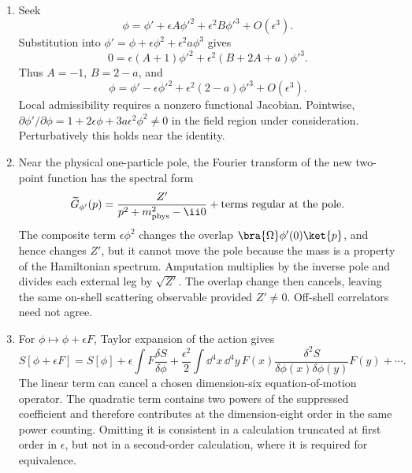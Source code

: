 \begin{enumerate}
\begin{enumerate}
\item
Seek
\[
 \phi=\phi'+\epsilon A\phi'^2+\epsilon^2B\phi'^3+O(\epsilon^3).
\]
Substitution into
\(\phi'=\phi+\epsilon\phi^2+\epsilon^2a\phi^3\) gives
\[
 0=\epsilon(A+1)\phi'^2
 +\epsilon^2(B+2A+a)\phi'^3.
\]
Thus \(A=-1\), \(B=2-a\), and
\[
 \phi=\phi'-\epsilon\phi'^2
       +\epsilon^2(2-a)\phi'^3+O(\epsilon^3).
\]
Local admissibility requires a nonzero functional Jacobian.  Pointwise,
\(\partial\phi'/\partial\phi
=1+2\epsilon\phi+3a\epsilon^2\phi^2\ne0\) in the field region under
consideration.  Perturbatively this holds near the identity.
\item
Near the physical one-particle pole, the Fourier transform of the new
two-point function has the spectral form
\[
 \widetilde G_{\phi'}(p)
 =\frac{Z'}{p^2+m_{\rm phys}^2-\ii0}
  +\text{terms regular at the pole}.
\]
The composite term \(\epsilon\phi^2\) changes the overlap
\(\bra{\Omega}\phi'(0)\ket{p}\), and hence changes \(Z'\), but it cannot
move the pole because the mass is a property of the Hamiltonian
spectrum.  Amputation multiplies by the inverse pole and divides each
external leg by \(\sqrt{Z'}\).  The overlap change then cancels, leaving
the same on-shell scattering observable provided \(Z'\ne0\).  Off-shell
correlators need not agree.
\item
For
\(\phi\mapsto\phi+\epsilon F\), Taylor expansion of the action gives
\[
 S[\phi+\epsilon F]
 =S[\phi]+\epsilon\int F\frac{\delta S}{\delta\phi}
 +\frac{\epsilon^2}{2}\int \dd^4x\,\dd^4y\,
 F(x)\frac{\delta^2S}{\delta\phi(x)\delta\phi(y)}F(y)+\cdots .
\]
The linear term can cancel a chosen dimension-six equation-of-motion
operator.  The quadratic term contains two powers of the suppressed
coefficient and therefore contributes at the dimension-eight order in
the same power counting.  Omitting it is consistent in a calculation
truncated at first order in \(\epsilon\), but not in a second-order
calculation, where it is required for equivalence.
\end{enumerate}


\end{enumerate}
